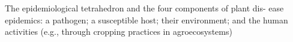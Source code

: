 The epidemiological tetrahedron and the four components of plant dis- ease epidemics: a pathogen; a susceptible host; their environment; and the human activities (e.g., through cropping practices in agroecosystems)